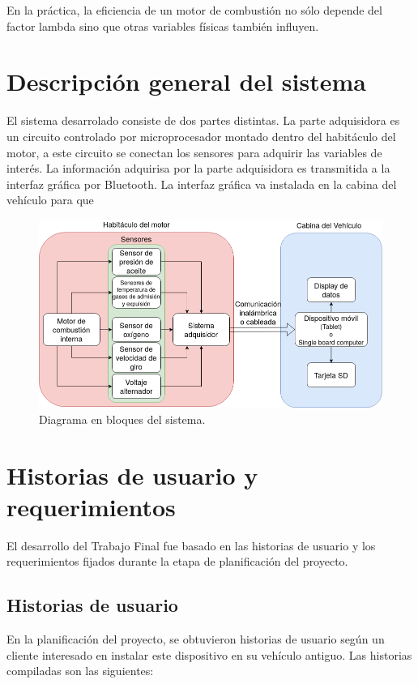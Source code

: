 En la práctica, la eficiencia de un motor de combustión no sólo depende del factor lambda sino que otras variables físicas también influyen. 

\section{Descripción general del sistema}

El sistema desarrolado consiste de dos partes distintas. La parte adquisidora es un circuito controlado por microprocesador montado dentro del habitáculo del motor, a este circuito se conectan los sensores para adquirir las variables de interés. La información adquirisa por la parte adquisidora es transmitida a la interfaz gráfica por Bluetooth. La interfaz gráfica va instalada en la cabina del vehículo para que 

\begin{figure}
\includegraphics[width=\textwidth]{./Figures/diagrama-proyecto.png}
\caption{Diagrama en bloques del sistema.}
\label{fig:diagrama-de-bloques}
\end{figure}

\section{Historias de usuario y requerimientos}

El desarrollo del Trabajo Final fue basado en las historias de usuario y los requerimientos fijados durante la etapa de planificación del proyecto.

\subsection{Historias de usuario}

En la planificación del proyecto, se obtuvieron historias de usuario según un cliente interesado en instalar este dispositivo en su vehículo antiguo. Las historias compiladas son las siguientes:

